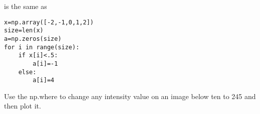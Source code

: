 is the same as

\begin{lstlisting}
x=np.array([-2,-1,0,1,2])
size=len(x)
a=np.zeros(size)
for i in range(size):
    if x[i]<.5:
        a[i]=-1
    else:
        a[i]=4
\end{lstlisting}

\begin{problem}
Use the np.where to change any intensity value on an image below ten to 245 and then plot it.
\end{problem}

\printbibliography

% 

